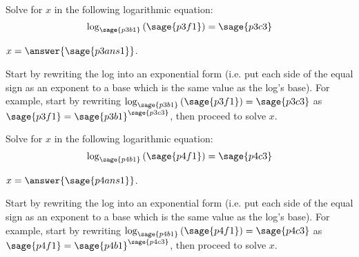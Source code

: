 \documentclass{ximera}
\begin{document}
\begin{problem}
    Solve for $x$ in the following logarithmic equation:
    \[
        \log_{\sage{p3b1}}\left(\sage{p3f1}\right) = \sage{p3c3}
    \]

    $x = \answer{\sage{p3ans1}}$.
    \begin{feedback}
        Start by rewriting the log into an exponential form (i.e. put each side of the equal sign as an exponent to a base which is the same value as the log's base). For example, start by rewriting $\log_{\sage{p3b1}}\left(\sage{p3f1}\right) = \sage{p3c3}$ as $\sage{p3f1} = \sage{p3b1}^{\sage{p3c3}}$, then proceed to solve $x$.
    \end{feedback}
\end{problem}


\begin{problem}
    Solve for $x$ in the following logarithmic equation:
    \[
        \log_{\sage{p4b1}}\left(\sage{p4f1}\right) = \sage{p4c3}
    \]

    $x = \answer{\sage{p4ans1}}$.
    \begin{feedback}
        Start by rewriting the log into an exponential form (i.e. put each side of the equal sign as an exponent to a base which is the same value as the log's base). For example, start by rewriting $\log_{\sage{p4b1}}\left(\sage{p4f1}\right) = \sage{p4c3}$ as $\sage{p4f1} = \sage{p4b1}^{\sage{p4c3}}$, then proceed to solve $x$.
    \end{feedback}
\end{problem}
\end{document}
